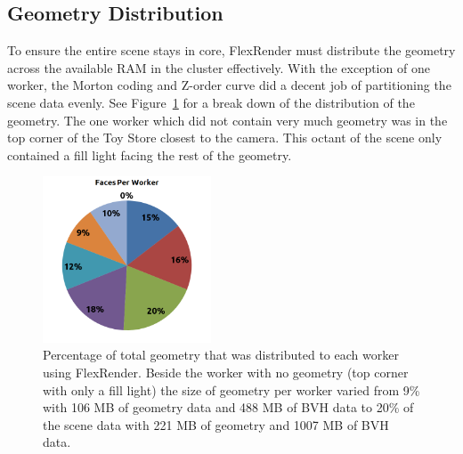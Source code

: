 \documentclass[a4paper,twoside]{article}
\begin{document}

\subsection{Geometry Distribution}
\label{geomdist}

To ensure the entire scene stays in core, FlexRender must distribute the
geometry across the available RAM in the cluster effectively. With the exception
of one worker, the Morton coding and Z-order curve did a decent job of
partitioning the scene data evenly. See Figure~\ref{fig:geomdist} for a break down of the 
distribution of the geometry.  The one worker which did not contain very much geometry was in the top corner
of the Toy Store closest to the camera. This octant of the scene only contained
a fill light facing the rest of the geometry.

\begin{figure}[h!]
    \centering
    \includegraphics[width=50mm]{figures/facesperworker.png}
    \caption{Percentage of total geometry that was distributed to each worker using FlexRender.  Beside the worker with no geometry (top corner with only a fill light) the size of geometry per worker varied from 9\% with 106 MB of geometry data and 488 MB of BVH data to 20\% of the scene data with  221 MB of geometry and 1007 MB of BVH data.}
    \label{fig:geomdist}
\end{figure}



\end{document}
